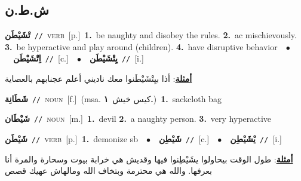 \documentclass[10pt,a4paper,twoside]{article} %
\begin{document}
\begin{multicols}{2}
\vspace{-3mm}
\subsection*{\color{blue}\foreignlanguage{arabic}{ش.ط.ن}\color{blue}{}} 

{\setlength\topsep{0pt}\textbf{\foreignlanguage{arabic}{تْشَيْطَن}}\ {\color{gray}\texttt{//}\color{black}}\ \textsc{verb}\ [p.]\ \textbf{1.}~be naughty and disobey the rules.  \textbf{2.}~ac mischievously.  \textbf{3.}~be hyperactive and play around (children).  \textbf{4.}~have disruptive behavior\ \ $\bullet$\ \ \setlength\topsep{0pt}\textbf{\foreignlanguage{arabic}{اِتْشَيْطَن}}\ {\color{gray}\texttt{//}\color{black}}\ [c.]\ \ $\bullet$\ \ \setlength\topsep{0pt}\textbf{\foreignlanguage{arabic}{يِتْشَيْطَن}}\ {\color{gray}\texttt{//}\color{black}}\ [i.]\  \begin{flushright}\color{gray}\foreignlanguage{arabic}{\textbf{\underline{\foreignlanguage{arabic}{أمثلة}}}: أذا بيِتْشَيْطَنوا معك ناديني أعلم عجنابهم بالعصاية}\end{flushright}\color{black}} \vspace{2mm}

{\setlength\topsep{0pt}\textbf{\foreignlanguage{arabic}{شَطَانِة}}\ {\color{gray}\texttt{//}\color{black}}\ \textsc{noun}\ [f.]\ \color{gray}(msa. \foreignlanguage{arabic}{كيس خيش}~\foreignlanguage{arabic}{\textbf{١.}})\color{black}\ \textbf{1.}~sackcloth bag\ } \vspace{2mm}

{\setlength\topsep{0pt}\textbf{\foreignlanguage{arabic}{شَيْطَان}}\ {\color{gray}\texttt{//}\color{black}}\ \textsc{noun}\ [m.]\ \textbf{1.}~devil  \textbf{2.}~a naughty person.  \textbf{3.}~very hyperactive\ } \vspace{2mm}

{\setlength\topsep{0pt}\textbf{\foreignlanguage{arabic}{شَيْطَن}}\ {\color{gray}\texttt{//}\color{black}}\ \textsc{verb}\ [p.]\ \textbf{1.}~demonize sb\ \ $\bullet$\ \ \setlength\topsep{0pt}\textbf{\foreignlanguage{arabic}{شَيْطِن}}\ {\color{gray}\texttt{//}\color{black}}\ [c.]\ \ $\bullet$\ \ \setlength\topsep{0pt}\textbf{\foreignlanguage{arabic}{يْشَيْطِن}}\ {\color{gray}\texttt{//}\color{black}}\ [i.]\  \begin{flushright}\color{gray}\foreignlanguage{arabic}{\textbf{\underline{\foreignlanguage{arabic}{أمثلة}}}: طول الوقت بيحاولوا يشَيْطِنوا فيها وقديش هي خرابة بيوت وسحارة والمرة أنا بعرفها. والله هي محترمة وبتخاف الله ومالهاش عهيك قصص}\end{flushright}\color{black}} \vspace{2mm}


\end{multicols}
\end{document}

